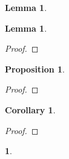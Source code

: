 \documentclass{article}
\newtheorem{env}[term]{}
\newtheorem{proposition}[term]{Proposition}
\newtheorem{cor}[term]{Corollary}
\newtheorem{lemma}[term]{Lemma}
\begin{document}
\begin{lemma}
\end{lemma}

\begin{lemma}
\end{lemma}

\begin{proof}
\end{proof}

\begin{proposition}
\end{proposition}

\begin{proof}
\end{proof}

\begin{cor}
\end{cor}

\begin{proof}
\end{proof}

\begin{env}
\end{env}
\end{document}
